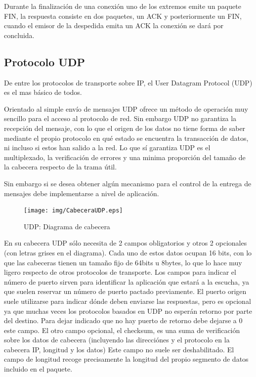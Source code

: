 \documentclass[a4paper,spanish,12pt]{book}
\begin{document}
Durante la finalización de una conexión uno de los extremos emite un paquete FIN, la respuesta consiste en dos paquetes, un ACK y posteriormente un FIN, cuando el emisor de la despedida emita un ACK la conexión se dará por concluida.


\subsection{Protocolo UDP}

De entre los protocolos de transporte sobre IP, el User Datagram Protocol (UDP) es el mas básico de todos.

Orientado al simple envío de mensajes UDP ofrece un m\'etodo de operación muy sencillo para el acceso al protocolo de red. Sin embargo UDP no garantiza la recepción del mensaje, con lo que el origen de los datos no tiene forma de saber mediante el propio protocolo en qué estado se encuentra la transacción de datos, ni incluso si estos han salido a la red. Lo que sí garantiza UDP es el multiplexado, la verificación de errores y una minima proporción del tamaño de la cabecera respecto de la trama útil. 

Sin embargo si se desea obtener algún mecanismo para el control de la entrega de mensajes debe implementarse a nivel de aplicación.
\begin{figure}[h]
	\begin{center}
	\texttt{[image: img/CabeceraUDP.eps]}	
\end{center}
\caption{UDP: Diagrama de cabecera}
  \label{fig:CabeceraUDP}
\end{figure}

En su cabecera UDP sólo necesita de 2 campos obligatorios y otros 2 opcionales (con letras grises en el diagrama). Cada uno de estos datos ocupan 16 bits, con lo que las cabeceras tienen un tamaño fijo de 64bits u 8bytes, lo que lo hace muy ligero respecto de otros protocolos de transporte. Los campos para indicar el número de puerto sirven para identificar la aplicación que estará a la escucha, ya que suelen reservar un número de puerto pactado previamente. El puerto origen suele utilizarse para indicar dónde deben enviarse las respuestas, pero es opcional ya que muchas veces los protocolos basados en UDP no esperán retorno por parte del destino. Para dejar indicado que no hay puerto de retorno debe dejarse a 0 este campo. El otro campo opcional, el checksum, es una suma de verificación sobre los datos de cabecera (incluyendo las direcciónes y el protocolo en la cabecera IP, longitud y los datos) Este campo no suele ser deshabilitado. El campo de longitud recoge precisamente la longitud del propio segmento de datos incluido en el paquete.
\end{document}
